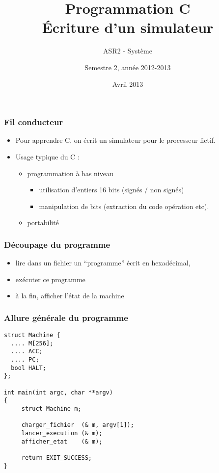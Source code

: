 \documentclass[]{beamer}
\subtitle{ASR2 - Système}
\title{Programmation C \\
Écriture d'un simulateur}
\author{Semestre 2, année 2012-2013}
\institute{
  Département informatique\\
  IUT Bordeaux 1
}
\date{Avril 2013}
\begin{document}
\newcommand{\bashlisting}[0]{\lstset{language=bash,numbers=left,numberstyle=\tiny,frame=single}}

\begin{frame}
  \titlepage
\end{frame}

\begin{frame}
\frametitle{Fil conducteur}

\begin{itemize}
\item
Pour apprendre C, on écrit un 
\alert{simulateur 
pour le processeur fictif}.

\item
\alert{Usage typique} du C :
\begin{itemize}
\item programmation à bas niveau
\begin{itemize}
\item utilisation d'entiers 16 bits (signés / non signés)
\item manipulation de bits (extraction du code opération etc).
\end{itemize}
\item portabilité
\end{itemize}
\end{itemize}

\end{frame}

\begin{frame}
\frametitle{Découpage du programme}
\begin{itemize}
\item \alert{lire} dans un fichier un ``programme'' écrit en hexadécimal, 
\item \alert{exécuter} ce programme
\item à la fin, \alert{afficher} l'état de la machine
\end{itemize}
\end{frame}

\begin{frame}[containsverbatim]
\frametitle{Allure générale du programme}
\begin{lstlisting}[style=sourcec]
struct Machine {
  .... M[256];  
  .... ACC;     
  .... PC;      
  bool HALT;
};

int main(int argc, char **argv)
{
     struct Machine m;

     charger_fichier  (& m, argv[1]);
     lancer_execution (& m);
     afficher_etat    (& m);

     return EXIT_SUCCESS;
}
\end{lstlisting}
\end{frame}
\end{document}
